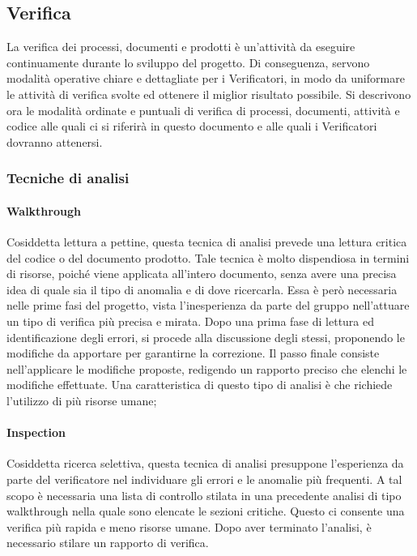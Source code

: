 \subsection{Verifica}
La verifica dei processi, documenti e prodotti è un'attività da eseguire continuamente durante lo sviluppo del progetto. Di conseguenza, servono modalità operative chiare e dettagliate per i Verificatori, in modo da uniformare le attività di verifica svolte ed ottenere il miglior risultato possibile. Si descrivono ora le modalità ordinate e puntuali di verifica di processi, documenti, attività e codice alle quali ci si riferirà in questo documento e alle quali i Verificatori dovranno attenersi.

\subsubsection{Tecniche di analisi}
\paragraph{Walkthrough}
Cosiddetta lettura a pettine, questa tecnica di analisi prevede una lettura critica del codice o del documento prodotto. Tale tecnica è molto dispendiosa in termini di risorse, poiché viene applicata all'intero documento, senza avere una precisa idea di quale sia il tipo di anomalia e di dove ricercarla. Essa è però necessaria nelle prime fasi del progetto, vista l'inesperienza da parte del gruppo nell'attuare un tipo di verifica più precisa e mirata. Dopo una prima fase di lettura ed identificazione degli errori, si procede alla discussione degli stessi, proponendo le modifiche da apportare per garantirne la correzione. Il passo finale consiste nell'applicare le modifiche proposte, redigendo un rapporto preciso che elenchi le modifiche effettuate. Una caratteristica di questo tipo di analisi è che richiede l'utilizzo di più risorse umane;
\paragraph{Inspection}
Cosiddetta ricerca selettiva, questa tecnica di analisi presuppone l'esperienza da parte del verificatore nel individuare gli errori e le anomalie più frequenti. A tal scopo è necessaria una lista di controllo stilata in una precedente analisi di tipo walkthrough nella quale sono elencate le sezioni critiche. Questo ci consente una verifica più rapida e meno risorse umane. Dopo aver terminato l'analisi, è necessario stilare un rapporto di verifica.

